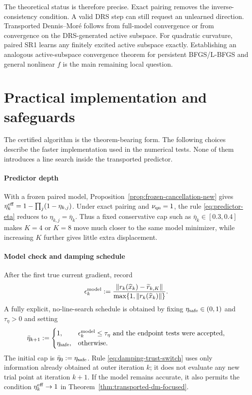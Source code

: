 \documentclass[10pt,leqno]{amsart}
\numberwithin{equation}{section}
\numberwithin{algorithm}{section}
\theoremstyle{remark}
\newcommand{\norm}[1]{\left\lVert #1 \right\rVert}
\begin{document}
The theoretical status is therefore precise.  Exact pairing removes the inverse-consistency condition.  A valid DRS step can still request an unlearned direction.  Transported Dennis--Mor\'e follows from full-model convergence or from convergence on the DRS-generated active subspace.  For quadratic curvature, paired SR1 learns any finitely excited active subspace exactly.  Establishing an analogous active-subspace convergence theorem for persistent BFGS/L-BFGS and general nonlinear $f$ is the main remaining local question.


\section{Practical implementation and safeguards}
\label{sec:heuristics}

The certified algorithm is the theorem-bearing form.  The following choices describe the faster implementation used in the numerical tests.  None of them introduces a line search inside the transported predictor.

\paragraph{Predictor depth}
With a frozen paired model, Proposition~\ref{prop:frozen-cancellation-new} gives
$\eta_k^{\rm eff}=1-\prod_j(1-\eta_{k,j})$.  Under exact pairing and $\nu_{\rm qn}=1$, the rule \eqref{eq:predictor-eta} reduces to $\eta_{k,j}=\bar\eta_k$.  Thus a fixed conservative cap such as $\bar\eta_k\in[0.3,0.4]$ makes $K=4$ or $K=8$ move much closer to the same model minimizer, while increasing $K$ further gives little extra displacement.

\paragraph{Model check and damping schedule}
After the first true current gradient, record
\begin{equation}
\label{eq:model-check}
    \epsilon_k^{\rm model}
    :=\frac{\norm{r_k(\widehat x_k)-\widetilde r_{k,K}}}
            {\max\{1,\norm{r_k(\widehat x_k)}\}}.
\end{equation}
A fully explicit, no-line-search schedule is obtained by fixing
$\eta_{\rm safe}\in(0,1)$ and $\tau_\eta>0$ and setting
\begin{equation}
\label{eq:damping-trust-switch}
  \bar\eta_{k+1}:=
  \begin{cases}
    1, & \epsilon_k^{\rm model}\le\tau_\eta
         \ \text{and the endpoint tests were accepted},\\
    \eta_{\rm safe}, & \text{otherwise}.
  \end{cases}
\end{equation}
The initial cap is $\bar\eta_0:=\eta_{\rm safe}$.  Rule \eqref{eq:damping-trust-switch} uses only information already obtained at outer iteration $k$; it does not evaluate any new trial point at iteration $k+1$.  If the model remains accurate, it also permits the condition $\eta_k^{\rm eff}\to1$ in Theorem~\ref{thm:transported-dm-focused}.
\end{document}
